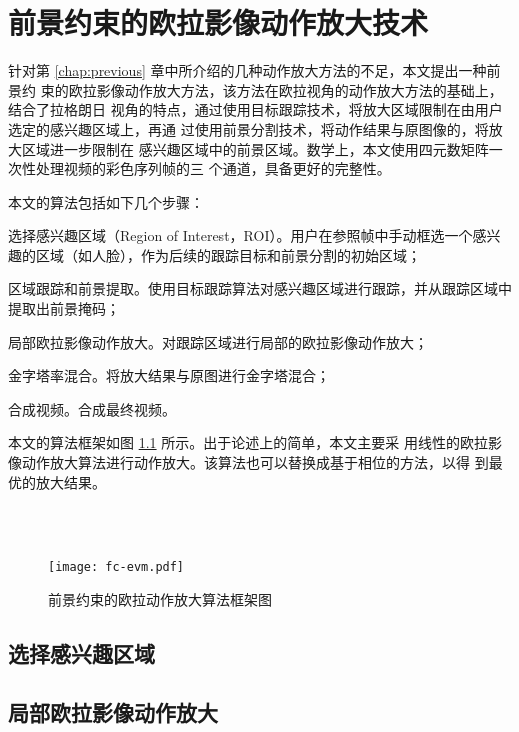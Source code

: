 \chapter{前景约束的欧拉影像动作放大技术}
\label{chap:fc-evm}

针对第 \ref{chap:previous} 章中所介绍的几种动作放大方法的不足，本文提出一种前景约
束的欧拉影像动作放大方法，该方法在欧拉视角的动作放大方法的基础上，结合了拉格朗日
视角的特点，通过使用目标跟踪技术，将放大区域限制在由用户选定的感兴趣区域上，再通
过使用前景分割技术，将动作结果与原图像的，将放大区域进一步限制在
感兴趣区域中的前景区域。数学上，本文使用四元数矩阵一次性处理视频的彩色序列帧的三
个通道，具备更好的完整性。

本文的算法包括如下几个步骤：

\begin{compactenum}
\item 选择感兴趣区域（Region of Interest，ROI）。用户在参照帧中手动框选一个感兴
  趣的区域（如人脸），作为后续的跟踪目标和前景分割的初始区域；
\item 区域跟踪和前景提取。使用目标跟踪算法对感兴趣区域进行跟踪，并从跟踪区域中提取出前景掩码；
\item 局部欧拉影像动作放大。对跟踪区域进行局部的欧拉影像动作放大；
\item 金字塔率混合。将放大结果与原图进行金字塔混合；
\item 合成视频。合成最终视频。
\end{compactenum}

本文的算法框架如图 \ref{fig:fc-evm-frameworks} 所示。出于论述上的简单，本文主要采
用线性的欧拉影像动作放大算法进行动作放大。该算法也可以替换成基于相位的方法，以得
到最优的放大结果。

\begin{landscape}
  ~\\
  ~\\
  \begin{figure}[htbp]
  \centering
  \texttt{[image: fc-evm.pdf]}
  \caption{前景约束的欧拉动作放大算法框架图}
  \label{fig:fc-evm-frameworks}
\end{figure}
\end{landscape}

\section{选择感兴趣区域}
\label{sec:choose-roi}



\section{局部欧拉影像动作放大}
\label{sec:local-evm}



